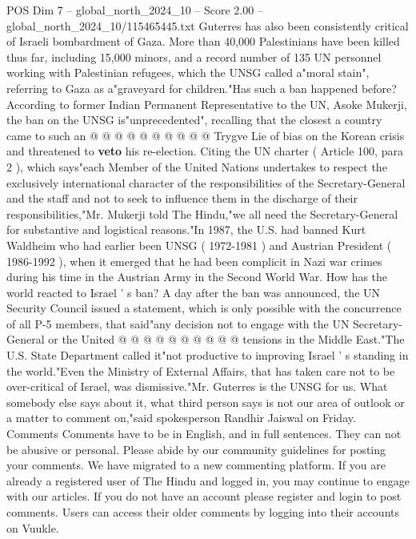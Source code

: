 \begin{textsample}{POS Dim 7 – global\_north\_2024\_10 – Score 2.00 – global\_north\_2024\_10/115465445.txt}
Guterres has also been consistently critical of Israeli bombardment of Gaza.
More than 40,000 Palestinians have been killed thus far, including 15,000 minors, and a record number of 135 UN personnel working with Palestinian refugees, which the UNSG called a"moral stain", referring to Gaza as a"graveyard for children."Has such a ban happened before?
According to former Indian Permanent Representative to the UN, Asoke Mukerji, the ban on the UNSG is"unprecedented", recalling that the closest a country came to such an @ @ @ @ @ @ @ @ @ @ Trygve Lie of bias on the Korean crisis and threatened to \textbf{veto} his re-election.
Citing the UN charter ( Article 100, para 2 ), which says"each Member of the United Nations undertakes to respect the exclusively international character of the responsibilities of the Secretary-General and the staff and not to seek to influence them in the discharge of their responsibilities,"Mr.
Mukerji told The Hindu,"we all need the Secretary-General for substantive and logistical reasons."In 1987, the U.S. had banned Kurt Waldheim who had earlier been UNSG ( 1972-1981 ) and Austrian President ( 1986-1992 ), when it emerged that he had been complicit in Nazi war crimes during his time in the Austrian Army in the Second World War.
How has the world reacted to Israel ' s ban?
A day after the ban was announced, the UN Security Council issued a statement, which is only possible with the concurrence of all P-5 members, that said"any decision not to engage with the UN Secretary-General or the United @ @ @ @ @ @ @ @ @ @ tensions in the Middle East."The U.S.
State Department called it"not productive to improving Israel ' s standing in the world."Even the Ministry of External Affairs, that has taken care not to be over-critical of Israel, was dismissive."Mr.
Guterres is the UNSG for us.
What somebody else says about it, what third person says is not our area of outlook or a matter to comment on,"said spokesperson Randhir Jaiswal on Friday.
Comments Comments have to be in English, and in full sentences.
They can not be abusive or personal.
Please abide by our community guidelines for posting your comments.
We have migrated to a new commenting platform.
If you are already a registered user of The Hindu and logged in, you may continue to engage with our articles.
If you do not have an account please register and login to post comments.
Users can access their older comments by logging into their accounts on Vuukle.

\end{textsample}
